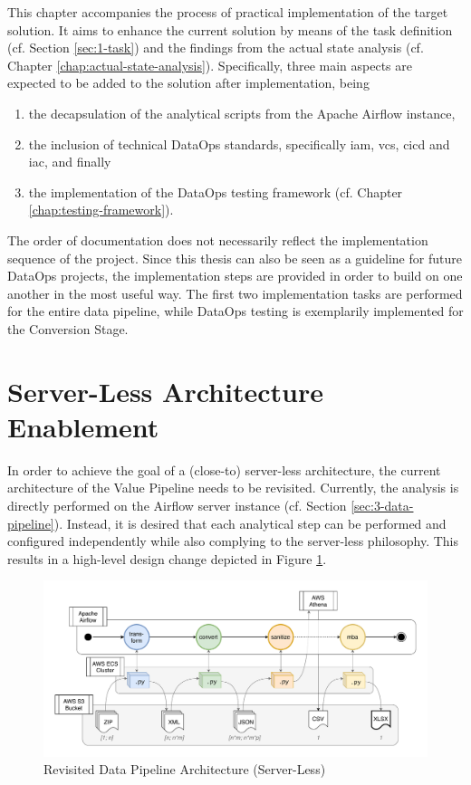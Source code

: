 
This chapter accompanies the process of practical implementation of the target solution. It aims to enhance the current solution by means of the task definition (cf. Section \ref{sec:1-task}) and the findings from the actual state analysis (cf. Chapter \ref{chap:actual-state-analysis}). Specifically, three main aspects are expected to be added to the solution after implementation, being

\begin{enumerate}
	\item the decapsulation of the analytical scripts from the Apache Airflow instance,
	\item the inclusion of technical DataOps standards, specifically \acs{iam}, \ac{vcs}, \ac{cicd} and \ac{iac}, and finally
	\item the implementation of the DataOps testing framework (cf. Chapter \ref{chap:testing-framework}).
\end{enumerate}

The order of documentation does not necessarily reflect the implementation sequence of the project. Since this thesis can also be seen as a guideline for future DataOps projects, the implementation steps are provided in order to build on one another in the most useful way. The first two implementation tasks are performed for the entire data pipeline, while DataOps testing is exemplarily implemented for the Conversion Stage.

\section{Server-Less Architecture Enablement}
In order to achieve the goal of a (close-to) server-less architecture, the current architecture of the Value Pipeline needs to be revisited. Currently, the analysis is directly performed on the Airflow server instance (cf. Section \ref{sec:3-data-pipeline}). Instead, it is desired that each analytical step can be performed and configured independently while also complying to the server-less philosophy. This results in a high-level design change depicted in Figure \ref{fig:5-new-pipeline}.
\newpage

\begin{figure}[h!]
	\centering
	\includegraphics[width=\linewidth]{main-matter/img/5-new-pipeline.pdf}
	\caption{Revisited Data Pipeline Architecture (Server-Less)}
	\label{fig:5-new-pipeline}
\end{figure}

